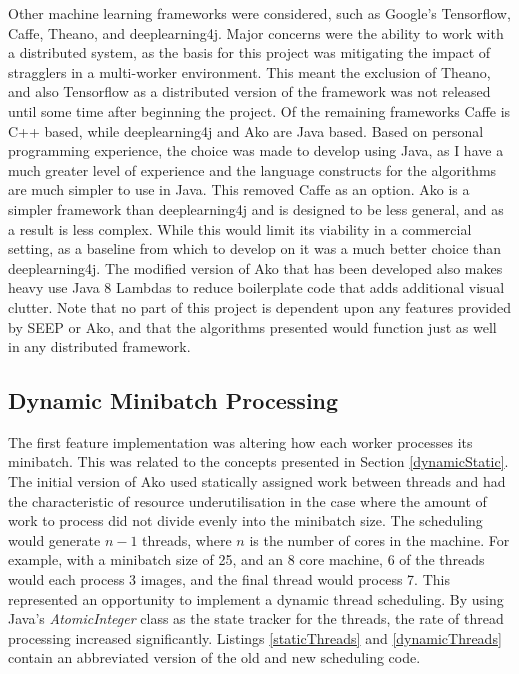 \documentclass[12pt]{article}
\begin{document}
Other machine learning frameworks were considered, such as Google's Tensorflow, Caffe, Theano, and deeplearning4j. Major concerns were the ability to work with a distributed system, as the basis for this project was mitigating the impact of stragglers in a multi-worker environment. This meant the exclusion of Theano, and also Tensorflow as a distributed version of the framework was not released until some time after beginning the project. Of the remaining frameworks Caffe is C++ based, while deeplearning4j and Ako are Java based. Based on personal programming experience, the choice was made to develop using Java, as I have a much greater level of experience and the language constructs for the algorithms are much simpler to use in Java. This removed Caffe as an option. Ako is a simpler framework than deeplearning4j and is designed to be less general, and as a result is less complex. While this would limit its viability in a commercial setting, as a baseline from which to develop on it was a much better choice than deeplearning4j. The modified version of Ako that has been developed also makes heavy use Java 8 Lambdas to reduce boilerplate code that adds additional visual clutter.
\newline
\newline
Note that no part of this project is dependent upon any features provided by SEEP or Ako, and that the algorithms presented would function just as well in any distributed framework.

\subsection{Dynamic Minibatch Processing}

The first feature implementation was altering how each worker processes its minibatch. This was related to the concepts presented in Section \ref{dynamicStatic}. The initial version of Ako used statically assigned work between threads and had the characteristic of resource underutilisation in the case where the amount of work to process did not divide evenly into the minibatch size. The scheduling would generate $n-1$ threads, where $n$ is the number of cores in the machine. For example, with a minibatch size of 25, and an 8 core machine, 6 of the threads would each process 3 images, and the final thread would process 7. This represented an opportunity to implement a dynamic thread scheduling. By using Java's \textit{AtomicInteger} class as the state tracker for the threads, the rate of thread processing increased significantly. Listings \ref{staticThreads} and \ref{dynamicThreads} contain an abbreviated version of the old and new scheduling code.
\end{document}
